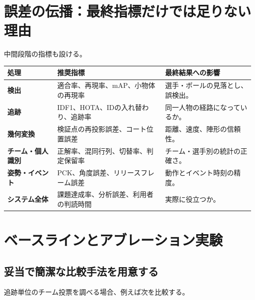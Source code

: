 \documentclass[11pt,a4paper,oneside]{report}
\begin{document}
\section{誤差の伝播：最終指標だけでは足りない理由}

\begin{center}
\begin{adjustbox}{max width=\linewidth}
\end{adjustbox}
\end{center}

中間段階の指標も設ける。

\begin{tabularx}{\textwidth}{>{\bfseries\RaggedRight}p{3cm} Y Y}
\toprule
処理 & 推奨指標 & 最終結果への影響 \\
\midrule
検出 & 適合率、再現率、mAP、小物体の再現率 & 選手・ボールの見落とし、誤検出。\\
追跡 & IDF1、HOTA、IDの入れ替わり、追跡率 & 同一人物の経路になっているか。\\
幾何変換 & 検証点の再投影誤差、コート位置誤差 & 距離、速度、陣形の信頼性。\\
チーム・個人識別 & 正解率、混同行列、切替率、判定保留率 & チーム・選手別の統計の正確さ。\\
姿勢・イベント & PCK、角度誤差、リリースフレーム誤差 & 動作とイベント時刻の精度。\\
システム全体 & 課題達成率、分析誤差、利用者の判読時間 & 実際に役立つか。\\
\bottomrule
\end{tabularx}

\section{ベースラインとアブレーション実験}

\subsection{妥当で簡潔な比較手法を用意する}

追跡単位のチーム投票を調べる場合、例えば次を比較する。
\end{document}

